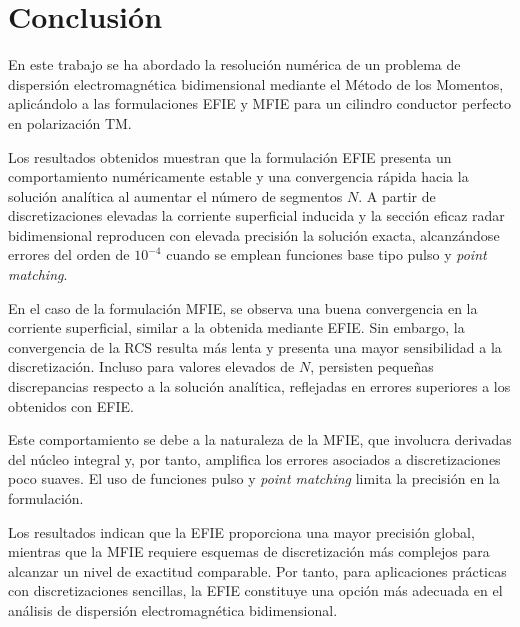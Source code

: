 \documentclass[11pt,a4paper,twoside,pdf]{article}
\numberwithin{equation}{section}
\begin{document}
\newpage






\section{Conclusión}

En este trabajo se ha abordado la resolución numérica de un problema de dispersión electromagnética bidimensional mediante el Método de los Momentos, aplicándolo a las formulaciones EFIE y MFIE para un cilindro conductor perfecto en polarización TM.

Los resultados obtenidos muestran que la formulación EFIE presenta un comportamiento numéricamente estable y una convergencia rápida hacia la solución analítica al aumentar el número de segmentos $N$. A partir de discretizaciones elevadas la corriente superficial inducida y la sección eficaz radar bidimensional reproducen con elevada precisión la solución exacta, alcanzándose errores del orden de $10^{-4}$ cuando se emplean funciones base tipo pulso y \textit{point matching}.

En el caso de la formulación MFIE, se observa una buena convergencia en la corriente superficial, similar a la obtenida mediante EFIE. Sin embargo, la convergencia de la RCS resulta más lenta y presenta una mayor sensibilidad a la discretización. Incluso para valores elevados de $N$, persisten pequeñas discrepancias respecto a la solución analítica, reflejadas en errores superiores a los obtenidos con EFIE.

Este comportamiento se debe a la naturaleza de la MFIE, que involucra derivadas del núcleo integral y, por tanto, amplifica los errores asociados a discretizaciones poco suaves. El uso de funciones pulso y \textit{point matching} limita la precisión en la formulación.

Los resultados indican que la EFIE proporciona una mayor precisión global, mientras que la MFIE requiere esquemas de discretización más complejos para alcanzar un nivel de exactitud comparable. Por tanto, para aplicaciones prácticas con discretizaciones sencillas, la EFIE constituye una opción más adecuada en el análisis de dispersión electromagnética bidimensional.



















\newpage



\end{document}
